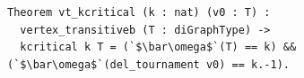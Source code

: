 \begin{lstlisting}[language=Rocq]
Theorem vt_kcritical (k : nat) (v0 : T) :
  vertex_transitiveb (T : diGraphType) ->
  kcritical k T = (`$\bar\omega$`(T) == k) && (`$\bar\omega$`(del_tournament v0) == k.-1).
\end{lstlisting}
